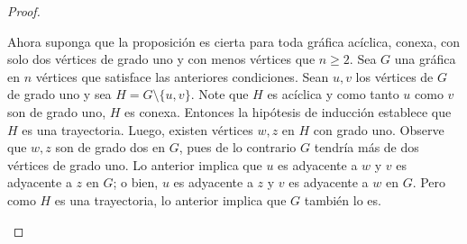 \documentclass[12pt]{article}
\begin{document}
\begin{proof}
\begin{itemize}
    Ahora suponga que la proposición es cierta para toda gráfica acíclica, conexa, con solo dos vértices de grado uno y con menos vértices que $n \geq 2.$ Sea $G$ una gráfica en $n$ vértices que satisface las anteriores condiciones. Sean $u,v$ los vértices de $G$ de grado uno y sea $H = G \setminus \{u,v\}.$ Note que $H$ es acíclica y como tanto $u$ como $v$ son de grado uno, $H$ es conexa. Entonces la hipótesis de inducción establece que $H$ es una trayectoria. Luego, existen vértices $w,z$ en $H$ con grado uno. Observe que $w,z$ son de grado dos en $G$, pues de lo contrario $G$ tendría más de dos vértices de grado uno. Lo anterior implica que $u$ es adyacente a $w$ y $v$ es adyacente a $z$ en $G$; o bien, $u$ es adyacente a $z$ y $v$ es adyacente a $w$ en $G.$ Pero como $H$ es una trayectoria, lo anterior implica que $G$ también lo es.

   
\end{itemize}
\end{proof}
\end{document}

